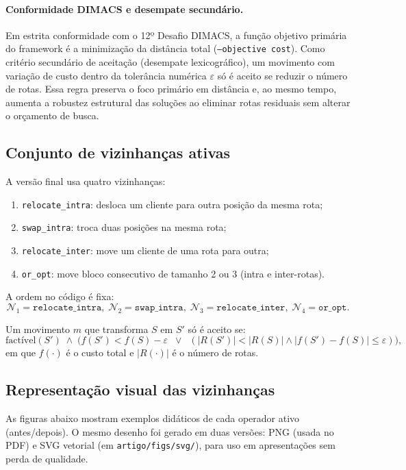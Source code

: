 \paragraph{Conformidade DIMACS e desempate secundário.}
Em estrita conformidade com o 12º Desafio DIMACS, a função objetivo primária do framework é a minimização da distância total (\texttt{--objective cost}). Como critério secundário de aceitação (desempate lexicográfico), um movimento com variação de custo dentro da tolerância numérica $\varepsilon$ só é aceito se reduzir o número de rotas. Essa regra preserva o foco primário em distância e, ao mesmo tempo, aumenta a robustez estrutural das soluções ao eliminar rotas residuais sem alterar o orçamento de busca.

\subsection{Conjunto de vizinhanças ativas}
\label{subsec:vnd_neighborhoods}

A versão final usa quatro vizinhanças:
\begin{enumerate}
  \item \texttt{relocate\_intra}: desloca um cliente para outra posição da mesma rota;
  \item \texttt{swap\_intra}: troca duas posições na mesma rota;
  \item \texttt{relocate\_inter}: move um cliente de uma rota para outra;
  \item \texttt{or\_opt}: move bloco consecutivo de tamanho 2 ou 3 (intra e inter-rotas).
\end{enumerate}

A ordem no código é fixa:
\[
\mathcal{N}_1=\texttt{relocate\_intra},\;
\mathcal{N}_2=\texttt{swap\_intra},\;
\mathcal{N}_3=\texttt{relocate\_inter},\;
\mathcal{N}_4=\texttt{or\_opt}.
\]

Um movimento $m$ que transforma $S$ em $S'$ só é aceito se:
\[
\text{factível}(S') \;\land\;
\Big(f(S') < f(S)-\varepsilon \;\;\lor\;\; (|R(S')|<|R(S)| \land |f(S')-f(S)|\le\varepsilon)\Big),
\]
em que $f(\cdot)$ é o custo total e $|R(\cdot)|$ é o número de rotas.

\subsection{Representação visual das vizinhanças}
\label{subsec:vnd_figuras}

As figuras abaixo mostram exemplos didáticos de cada operador ativo (antes/depois). O mesmo desenho foi gerado em duas versões: PNG (usada no PDF) e SVG vetorial (em \texttt{artigo/figs/svg/}), para uso em apresentações sem perda de qualidade.

